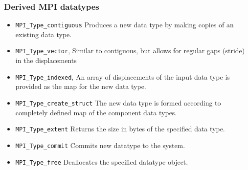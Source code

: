 \begin{frame}[containsverbatim]
\frametitle{Derived MPI datatypes}	
\begin{itemize}
	\item \verb+MPI_Type_contiguous+ Produces a new data type by making copies of an existing data type. 
	\item \verb+MPI_Type_vector+, Similar to contiguous, but allows for regular gaps (stride) in the displacements
	\item \verb+MPI_Type_indexed+, An array of displacements of the input data type is provided as the map for the new data type.
	\item \verb+MPI_Type_create_struct+ The new data type is formed according to completely defined map of the component data types. 
	\item \verb+MPI_Type_extent+ Returns the size in bytes of the specified data type.
	\item \verb+MPI_Type_commit+ Commits new datatype to the system. 
	\item \verb+MPI_Type_free+ Deallocates the specified datatype object.
\end{itemize}

\end{frame}

